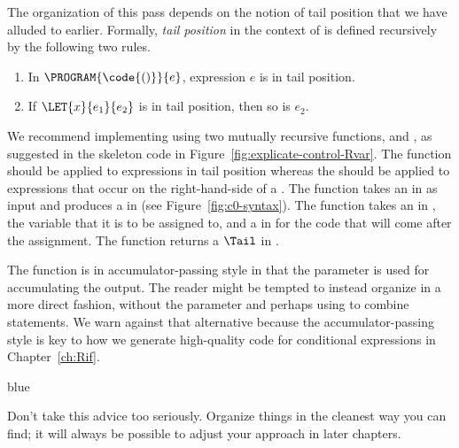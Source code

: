 \documentclass[11pt]{book}
\newenvironment{ocamlx}{
  \begin{color}{blue}
}
{
  \end{color}
}
\begin{document}
The organization of this pass depends on the notion of tail position
that we have alluded to earlier. Formally, \emph{tail
  position} in the context of \LangVar{} is
defined recursively by the following two rules.
\begin{enumerate}
\item In $\PROGRAM{\code{()}}{e}$, expression $e$ is in tail position.
\item If $\LET{x}{e_1}{e_2}$ is in tail position, then so is $e_2$.
\end{enumerate}

We recommend implementing  using two mutually
recursive functions,  and
, as suggested in the skeleton code in
Figure~\ref{fig:explicate-control-Rvar}.  The 
function should be applied to expressions in tail position whereas the
 should be applied to expressions that occur on
the right-hand-side of a .
%
The  function takes an \Exp{} in \LangVar{} as
input and produces a \Tail{} in \LangCVar{} (see
Figure~\ref{fig:c0-syntax}).
%
The  function takes an \Exp{} in \LangVar{},
the variable that it is to be assigned to, and a \Tail{} in
\LangCVar{} for the code that will come after the assignment.  The
 function returns a $\Tail$ in \LangCVar{}.

The  function is in accumulator-passing style
in that the  parameter is used for accumulating the
output. The reader might be tempted to instead organize
 in a more direct fashion, without the
 parameter and perhaps using  to combine
statements. We warn against that alternative because the
accumulator-passing style is key to how we generate high-quality code
for conditional expressions in Chapter~\ref{ch:Rif}.
\begin{ocamlx}
  Don't take this advice too seriously. Organize things in the cleanest way you
  can find; it will always be  possible to adjust your approach in later chapters.
\end{ocamlx}
\end{document}
